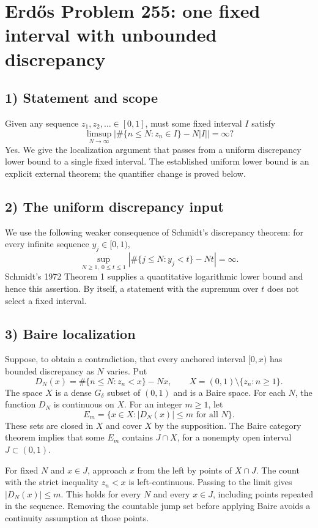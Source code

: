 \section{Erd\H{o}s Problem 255: one fixed interval with unbounded discrepancy}

\subsection{1) Statement and scope}
Given any sequence $z_1,z_2,\ldots\in[0,1]$, must some fixed
interval $I$ satisfy
\[
 \limsup_{N\to\infty}
 \left|\#\{n\leq N:z_n\in I\}-N|I|\right|=\infty?
\]
Yes. We give the localization argument that passes from a
uniform discrepancy lower bound to a single fixed interval.
The established uniform lower bound is an explicit external
theorem; the quantifier change is proved below.

\subsection{2) The uniform discrepancy input}
We use the following weaker consequence of Schmidt's discrepancy
theorem: for every infinite sequence $y_j\in[0,1)$,
\[
 \sup_{N\geq1,\ 0\leq t\leq1}
  \left|\#\{j\leq N:y_j<t\}-Nt\right|=\infty.
\]
Schmidt's 1972 Theorem 1 supplies a quantitative logarithmic
lower bound and hence this assertion. By itself, a statement
with the supremum over $t$ does not select a fixed interval.

\subsection{3) Baire localization}
Suppose, to obtain a contradiction, that every anchored interval
$[0,x)$ has bounded discrepancy as $N$ varies. Put
\[
 D_N(x)=\#\{n\leq N:z_n<x\}-Nx,\qquad
 X=(0,1)\setminus\{z_n:n\geq1\}.
\]
The space $X$ is a dense $G_\delta$ subset of $(0,1)$ and is
a Baire space. For each $N$, the function $D_N$ is continuous
on $X$. For an integer $m\geq1$, let
\[
 E_m=\{x\in X:|D_N(x)|\leq m\text{ for all }N\}.
\]
These sets are closed in $X$ and cover $X$ by the supposition.
The Baire category theorem implies that some $E_m$ contains
$J\cap X$, for a nonempty open interval $J\subset(0,1)$.

For fixed $N$ and $x\in J$, approach $x$ from the left by
points of $X\cap J$. The count with the strict inequality
$z_n<x$ is left-continuous. Passing to the limit gives
$|D_N(x)|\leq m$. This holds for every $N$ and every $x\in J$,
including points repeated in the sequence. Removing the
countable jump set before applying Baire avoids a continuity
assumption at those points.

